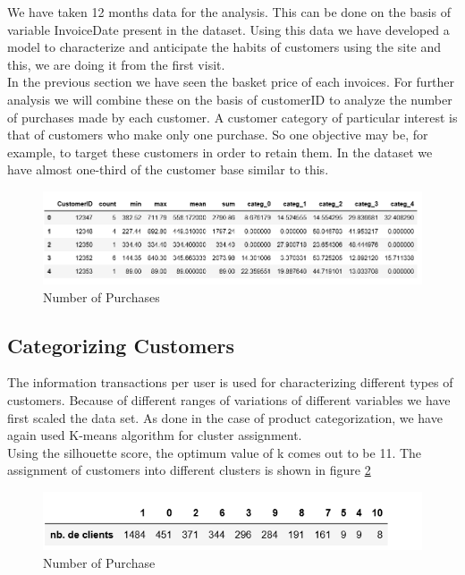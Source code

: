 We have taken 12 months data for the analysis. This can be done on the basis of variable InvoiceDate present in the dataset. Using this data we have developed a model to characterize and anticipate the habits of customers using the site and this, we are doing it from the first visit.\\

In the previous section we have seen the basket price of each invoices. For further analysis we will combine these on the basis of customerID to analyze the number of purchases made by each customer. A customer category of particular interest is that of customers who make only one purchase. So one objective may be, for example, to target these customers in order to retain them. In the dataset we have almost one-third of the customer base similar to this.

\begin{figure}[H]
\caption{Number of Purchases}
\label{4.2}
\centering
\includegraphics[width=\columnwidth]{images/4_2.PNG}
\end{figure}


\subsection{Categorizing Customers}

The information transactions per user is used for characterizing different types of customers. Because of different ranges of variations of different variables we have first scaled the data set. As done in the case of product categorization, we have again used K-means algorithm for cluster assignment.\\

Using the silhouette score, the optimum value of k comes out to be 11. The assignment of customers into different clusters is shown in figure \ref{4.3}

\begin{figure}[H]
\caption{Number of Purchase}
\label{4.3}
\centering
\includegraphics[width=\columnwidth]{images/4_3.PNG}
\end{figure}

